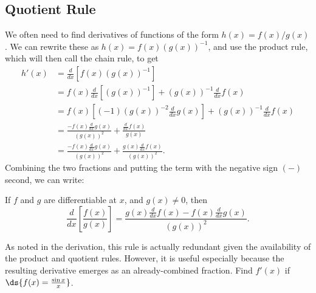 \subsection{Quotient Rule}
We often need to find derivatives of functions of the
form $h(x)=f(x)/g(x)$.  We can rewrite these as
$h(x)=f(x)\left(g(x)\right)^{-1}$, and use the
product rule, which will then call the chain rule, to get
\begin{align*}
h'(x)&=\frac{d}{dx}\left[f(x)(g(x))^{-1}\right]\\
&=f(x)\frac{d}{dx}\left[(g(x))^{-1}\right]
   +(g(x))^{-1}\frac{d}{dx}f(x)\\
&=f(x)\left[(-1)(g(x))^{-2}\frac{d}{dx}g(x)\right]
   +(g(x))^{-1}\frac{d}{dx}f(x)\\
&=\frac{-f(x)\frac{d}{dx}g(x)}{(g(x))^2}+\frac{\frac{d}{dx}f(x)}{g(x)}\\
&=\frac{-f(x)\frac{d}{dx}g(x)}{(g(x))^2}+
     \frac{g(x)\frac{d}{dx}f(x)}{(g(x))^2}.
\end{align*}
Combining the two fractions and putting the term with the negative sign
$(-)$ second, we can write:
\begin{theorem}If $f$ and $g$ are differentiable at $x$, and $g(x)\ne0$, then
\begin{equation}\frac{d}{dx}\left[\frac{f(x)}{g(x)}\right]
=\frac{g(x)\frac{d}{dx}f(x)-f(x)\frac{d}{dx}g(x)}{(g(x))^2}.
\label{QuotientRule}
\end{equation}
\label{QuotientRuleTheorem}\end{theorem}
As noted in the derivation, this rule is actually redundant
given the availability of the product and quotient rules. 
However, it is useful especially because the 
resulting derivative emerges as an already-combined fraction.
\bex Find $f'(x)$ if $\ds{f(x)=\frac{\sin x}{x}}$.

